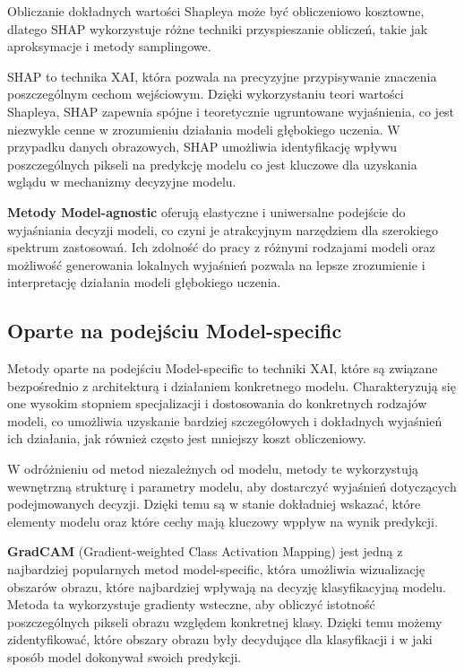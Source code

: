 Obliczanie dokładnych wartości Shapleya może być obliczeniowo kosztowne, dlatego SHAP wykorzystuje różne techniki przyspieszanie obliczeń, takie jak aproksymacje i metody samplingowe.

SHAP to technika XAI, która pozwala na precyzyjne przypisywanie znaczenia poszczególnym cechom wejściowym.
Dzięki wykorzystaniu teori wartości Shapleya, SHAP zapewnia spójne i teoretycznie ugruntowane wyjaśnienia, co jest niezwykle cenne w zrozumieniu działania modeli głębokiego uczenia.
W przypadku danych obrazowych, SHAP umożliwia identyfikację wpływu poszczególnych pikseli na predykcję modelu co jest kluczowe dla uzyskania wglądu w mechanizmy decyzyjne modelu.

\vspace{1cm}
\textbf{Metody Model-agnostic} oferują elastyczne i uniwersalne podejście do wyjaśniania decyzji modeli, co czyni je atrakcyjnym narzędziem dla szerokiego spektrum zastosowań.
Ich zdolność do pracy z różnymi rodzajami modeli oraz możliwość generowania lokalnych wyjaśnień pozwala na lepsze zrozumienie i interpretację działania modeli głębokiego uczenia.

\subsection*{Oparte na podejściu Model-specific}
Metody oparte na podejściu Model-specific to techniki XAI, które są związane bezpośrednio z architekturą i działaniem konkretnego modelu.
Charakteryzują się one wysokim stopniem specjalizacji i dostosowania do konkretnych rodzajów modeli, co umożliwia uzyskanie bardziej szczegółowych i dokładnych wyjaśnień ich działania, jak również często jest mniejszy koszt obliczeniowy.

W odróżnieniu od metod niezależnych od modelu, metody te wykorzystują wewnętrzną strukturę i parametry modelu, aby dostarczyć wyjaśnień dotyczących podejmowanych decyzji.
Dzięki temu są w stanie dokładniej wskazać, które elementy modelu oraz które cechy mają kluczowy wppływ na wynik predykcji.

\textbf{GradCAM} (Gradient-weighted Class Activation Mapping) jest jedną z najbardziej popularnych metod model-specific, która umożliwia wizualizację obszarów obrazu, które najbardziej wpływają na decyzję klasyfikacyjną modelu.
Metoda ta wykorzystuje gradienty wsteczne, aby obliczyć istotność poszczególnych pikseli obrazu względem konkretnej klasy.
Dzięki temu możemy zidentyfikować, które obszary obrazu były decydujące dla klasyfikacji i w jaki sposób model dokonywał swoich predykcji.

